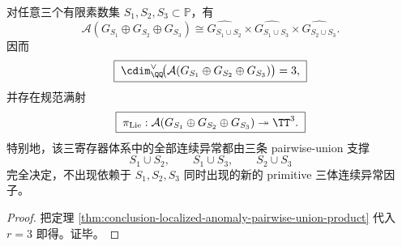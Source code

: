 \begin{corollary}\label{cor:conclusion-localized-three-register-no-primitive-triple-anomaly}
对任意三个有限素数集 \(S_1,S_2,S_3\subset\mathbb P\)，有
\[
\boxed{\;
\mathcal A(G_{S_1}\oplus G_{S_2}\oplus G_{S_3})
\cong
\widehat{G_{S_1\cup S_2}}
\times
\widehat{G_{S_1\cup S_3}}
\times
\widehat{G_{S_2\cup S_3}}.\;}
\]
因而
\[
\boxed{\;
\cdim_{\QQ}^{\vee}\!\bigl(\mathcal A(G_{S_1}\oplus G_{S_2}\oplus G_{S_3})\bigr)=3,\;}
\]
并存在规范满射
\[
\boxed{\;
\pi_{\mathrm{Lie}}:\mathcal A(G_{S_1}\oplus G_{S_2}\oplus G_{S_3})\twoheadrightarrow \TT^3.\;}
\]
特别地，该三寄存器体系中的全部连续异常都由三条 pairwise-union 支撑
\[
S_1\cup S_2,\qquad
S_1\cup S_3,\qquad
S_2\cup S_3
\]
完全决定，不出现依赖于 \(S_1,S_2,S_3\) 同时出现的新的 primitive 三体连续异常因子。
\end{corollary}
\begin{proof}
把定理 \ref{thm:conclusion-localized-anomaly-pairwise-union-product} 代入 \(r=3\) 即得。证毕。
\end{proof}

